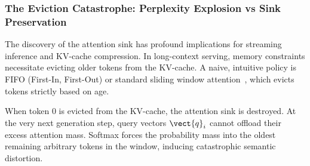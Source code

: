 \subsubsection{The Eviction Catastrophe: Perplexity Explosion vs Sink Preservation}
\label{sec:phenom_sink_eviction}

The discovery of the attention sink has profound implications for streaming inference and KV-cache compression. In long-context serving, memory constraints necessitate evicting older tokens from the KV-cache. A naive, intuitive policy is FIFO (First-In, First-Out) or standard sliding window attention~\cite{beltagy2020longformer}, which evicts tokens strictly based on age.

When token $0$ is evicted from the KV-cache, the attention sink is destroyed. At the very next generation step, query vectors $\vect{q}_i$ cannot offload their excess attention mass. Softmax forces the probability mass into the oldest remaining arbitrary tokens in the window, inducing catastrophic semantic distortion. 

